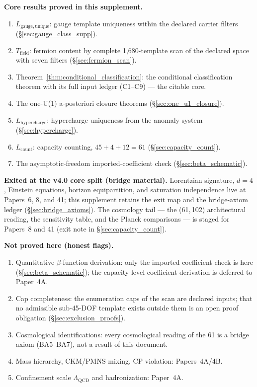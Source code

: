 \documentclass[11pt]{article}
\theoremstyle{definition}
\begin{document}
\begin{tcolorbox}[apfbox, title={What Is Assumed, What Is Proved, What Is Deferred}]
\smallskip\noindent\textbf{Core results proved in this supplement.}
\begin{enumerate}[nosep,label=\arabic*.,leftmargin=2em]
  \item $L_{\mathrm{gauge,unique}}$: gauge template uniqueness within
  the declared carrier filters (\S\ref{sec:gauge_class_supp}).
  \item $T_{\mathrm{field}}$: fermion content by complete
  1{,}680-template scan of the declared space with seven filters
  (\S\ref{sec:fermion_scan}).
  \item Theorem~\ref{thm:conditional_classification}: the conditional
  classification theorem with its full input ledger (C1--C9) --- the
  citable core.
  \item The one-U(1) a-posteriori closure theorems
  (\S\ref{sec:one_u1_closure}).
  \item $L_{\mathrm{hypercharge}}$: hypercharge uniqueness from the
  anomaly system (\S\ref{sec:hypercharge}).
  \item $L_{\mathrm{count}}$: capacity counting, $45+4+12=61$
  (\S\ref{sec:capacity_count}).
  \item The asymptotic-freedom imported-coefficient check
  (\S\ref{sec:beta_schematic}).
\end{enumerate}

\smallskip\noindent\textbf{Exited at the v4.0 core split (bridge
material).}  Lorentzian signature, $d=4$, Einstein equations, horizon
equipartition, and saturation independence live at Papers~6, 8, and 41;
this supplement retains the exit map and the bridge-axiom ledger
(\S\ref{sec:bridge_axioms}).  The cosmology tail --- the (61,\,102)
architectural reading, the sensitivity table, and the Planck
comparisons --- is staged for Papers~8 and 41 (exit note in
\S\ref{sec:capacity_count}).

\smallskip\noindent\textbf{Not proved here (honest flags).}
\begin{enumerate}[nosep,label=\arabic*.,leftmargin=2em]
  \item Quantitative $\beta$-function derivation: only the imported
  coefficient check is here (\S\ref{sec:beta_schematic}); the
  capacity-level coefficient derivation is deferred to Paper~4A.
  \item Cap completeness: the enumeration caps of the scan are
  declared inputs; that no admissible sub-45-DOF template exists
  outside them is an open proof obligation
  (\S\ref{sec:exclusion_proofs}).
  \item Cosmological identifications: every cosmological reading of
  the 61 is a bridge axiom (BA5--BA7), not a result of this document.
  \item Mass hierarchy, CKM/PMNS mixing, CP violation: Papers~4A/4B.
  \item Confinement scale $\Lambda_{\mathrm{QCD}}$ and hadronization:
  Paper~4A.
\end{enumerate}
\end{tcolorbox}
\end{document}
